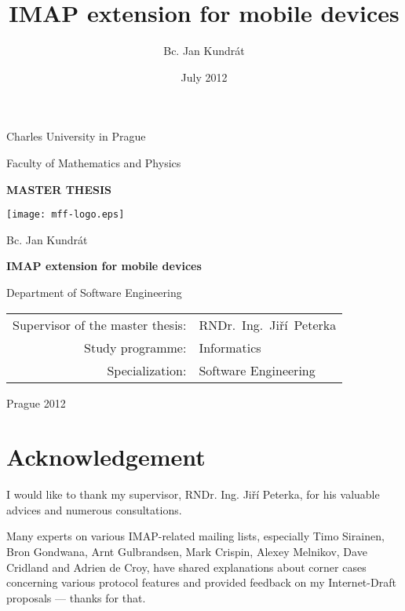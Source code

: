 \documentclass[11pt,a4paper]{report}
\begin{document}
\title{IMAP extension for mobile devices}

\author{Bc. Jan Kundrát}

\date{July 2012}

\begin{titlepage}
\begin{center}
\large

Charles University in Prague

\medskip

Faculty of Mathematics and Physics

\vfill

{\bf\Large MASTER THESIS}

\vfill

\centerline{\mbox{\texttt{[image: mff-logo.eps]}}}

\vfill
\vspace{5mm}

{\LARGE Bc. Jan Kundrát}

\vspace{15mm}

{\LARGE\bfseries IMAP extension for mobile devices}

\vfill

Department of Software Engineering

\vfill

\begin{tabular}{rl}

Supervisor of the master thesis: & RNDr.~Ing.~Jiří~Peterka \\
\noalign{\vspace{2mm}}
Study programme: & Informatics \\
\noalign{\vspace{2mm}}
Specialization: & Software Engineering \\
\end{tabular}

\vfill

Prague 2012

\end{center}
\end{titlepage}

\section*{Acknowledgement}
I would like to thank my supervisor, RNDr. Ing. Jiří Peterka, for his valuable advices and numerous consultations.

Many experts on various IMAP-related mailing lists, especially Timo Sirainen, Bron Gondwana, Arnt Gulbrandsen, Mark
Crispin, Alexey Melnikov, Dave Cridland and Adrien de Croy, have  shared explanations about corner cases concerning
various protocol features and provided feedback on my Internet-Draft proposals --- thanks for that.
\end{document}
